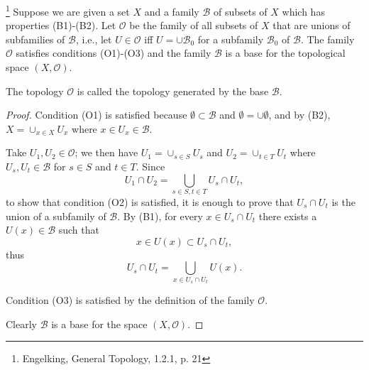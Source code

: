\begin{proposition}  \label{P:top_base}
\footnote{Engelking, General Topology, 1.2.1, p. 21}
Suppose we are given a set $X$ and a family $\mathcal{B}$ of subsets of $X$ 
which has properties (B1)-(B2). Let $\mathcal{O}$ be the family of all subsets
of $X$ that are unions of subfamilies of $\mathcal{B}$, i.e., let 
$U\in \mathcal{O}$ iff $U=\cup\mathcal{B}_0$ for a subfamily $\mathcal{B}_0$
of $\mathcal{B}$. The family $\mathcal{O}$ satisfies conditions (O1)-(O3) and 
the family $\mathcal{B}$ is a base for the topological space $(X,\mathcal{O})$.

The topology $\mathcal{O}$ is called the topology generated by the base
$\mathcal{B}$.
\end{proposition}
\begin{proof}
Condition (O1) is satisfied because $\emptyset\subset\mathcal{B}$ and 
$\emptyset=\cup\emptyset$, and by (B2), $X=\cup_{x\in X}U_x$ where 
$x\in U_x\in\mathcal{B}$.

Take $U_1,U_2\in\mathcal{O}$; we then have $U_1=\cup_{s\in S}U_s$
and $U_2=\cup_{t\in T}U_t$ where $U_s,U_t\in\mathcal{B}$ for $s\in S$ and
$t\in T$. Since
\[
  U_1\cap U_2= \bigcup_{s\in S, t\in T} U_s\cap U_t,
\]
to show that condition (O2) is satisfied, it is enough to prove that
$U_s\cap U_t$ is the union of a subfamily of $\mathcal{B}$. By (B1), for
every $x\in U_s\cap U_t$ there exists a $U(x)\in\mathcal{B}$ such that
\[
  x\in U(x) \subset U_s\cap U_t,
\]
thus
\[
  U_s\cap U_t = \bigcup_{x\in U_s\cap U_t} U(x).
\]

Condition (O3) is satisfied by the definition of the family $\mathcal{O}$.

Clearly $\mathcal{B}$ is a base for the space $(X,\mathcal{O})$.
\end{proof}


